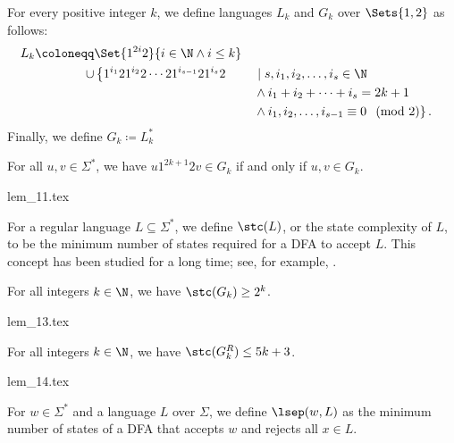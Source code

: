 \documentclass[preprint, 12pt]{elsarticle}
\begin{document}
	\begin{definition}
		 For every positive integer $k$, we define languages $L_k$ and $G_k$ over $\Sets{1,2}$ as follows:
		\begin{equation*}
		 	\begin{aligned}
		 		L_k \coloneqq& \Set{1^{2i}2}{i \in \N \wedge i \leq k}
				\\
				\cup& \left\{1^{i_1}21^{i_2}2   \cdots 21^{i_{s - 1}}21^{i_s}2\right. &&\mid{} s, i_1, i_2, \ldots, i_s \in  \N \\
				&  &&\wedge{} i_1 + i_2 + \cdots + i_s = 2k + 1 \\
				& &&\wedge{} i_1, i_2, \ldots, i_{s - 1} \equiv 0  \left. \pmod{2} \right\}.
		 	\end{aligned}
		\end{equation*}
		Finally, we define $G_k \coloneqq L_k^*$
	\end{definition}
	
	\begin{lemma}
		\label{lem:11}
		For all $u, v \in \Sigma^*$, we have $u1^{2k+1}2v \in G_k$ if and only if $u,v \in G_k$.	
	\end{lemma}
	{lem_11.tex}
	
	\begin{definition}
		For a regular language $L \subseteq \Sigma^*$, we define $\stc(L)$, or the state complexity of $L$, to be the minimum number of states required for a DFA to accept $L$. This concept has been studied for a long time; see, for example, \cite{maslov1970estimates, YuZS92, YuZS94}.
	\end{definition}

	
	\begin{lemma}
		\label{lem:13}
		For all integers $k \in \N$, we have $\stc(G_k) \geq 2^k$.
	\end{lemma}
	{lem_13.tex}
		
	\begin{lemma}
		\label{lem:14}
		For all integers $k \in \N$, we have $\stc(G_k^R) \leq 5k + 3$.
	\end{lemma}
	{lem_14.tex}
	

	
	\begin{definition}
		For $w \in \Sigma^*$ and a language $L$ over $\Sigma$, we define $\lsep(w, L)$ as the minimum number of states of a DFA that accepts $w$ and rejects all $x \in L$.
	\end{definition}
	
\end{document}
